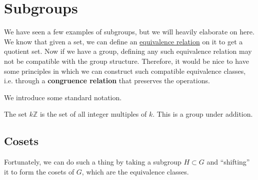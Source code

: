\section{Subgroups} 

  We have seen a few examples of subgroups, but we will heavily elaborate on here. We know that given a set, we can define an \hyperref[st-def:equivalence_relation]{equivalence relation} on it to get a quotient set. Now if we have a group, defining any such equivalence relation may not be compatible with the group structure. Therefore, it would be nice to have some principles in which we can construct such compatible equivalence classes, i.e. through a \textbf{congruence relation} that preserves the operations. 

  We introduce some standard notation. 

  \begin{definition}
    \label{def:subgroup-of-integer-multiples}
    The set $k \mathbb{Z}$ is the set of all integer multiples of $k$. This is a group under addition. 
  \end{definition}

\subsection{Cosets}

  Fortunately, we can do such a thing by taking a subgroup $H \subset G$ and ``shifting'' it to form the cosets of $G$, which are the equivalence classes. 
  

